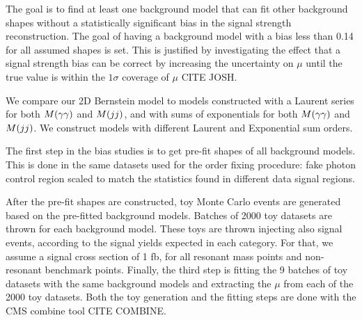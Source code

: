 The goal is to find at least one background model that can fit other background shapes without a statistically significant bias in the signal strength reconstruction. The goal of having a background model with a bias less than 0.14 for all assumed shapes is set. This is justified by investigating the effect that a signal strength bias can be correct by increasing the uncertainty on $\mu$ until the true value is within the $1\sigma$ coverage of $\mu$ CITE JOSH. 

We compare our 2D Bernstein model to models constructed with a Laurent series for both $M(\gamma\gamma)$ and $M(jj)$, and with sums of exponentials for both $M(\gamma\gamma)$ and $M(jj)$. 
We construct models with different Laurent and Exponential sum orders. 

The first step in the bias studies is to get pre-fit shapes of all background models. 
This is done in the same datasets used for the order fixing procedure: fake photon control region scaled to match the statistics found in different data signal regions. 

After the pre-fit shapes are constructed, toy Monte Carlo events are generated based on the pre-fitted background models. Batches of 2000 toy datasets are thrown for each background model. These toys are thrown injecting also signal events, according to the signal yields expected in each category. For that, we assume a signal cross section of 1 fb, for all resonant mass points and non-resonant benchmark points. Finally, the third step is fitting the 9 batches of toy datasets with the same background models and extracting the $\mu$ from each of the 2000 toy datasets. Both the toy generation and the fitting steps are done with the CMS combine tool CITE COMBINE.

